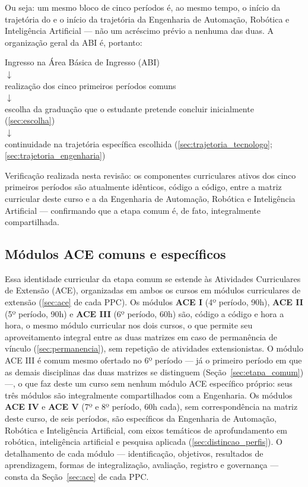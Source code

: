 Ou seja: um mesmo bloco de cinco períodos é, ao mesmo tempo, o início da trajetória do \ppccurso e o início da trajetória da Engenharia de Automação, Robótica e Inteligência Artificial — não um acréscimo prévio a nenhuma das duas. A organização geral da ABI é, portanto:

\begin{center}
Ingresso na Área Básica de Ingresso (ABI) \\
$\downarrow$ \\
realização dos cinco primeiros períodos comuns \\
$\downarrow$ \\
escolha da graduação que o estudante pretende concluir inicialmente (\autoref{sec:escolha}) \\
$\downarrow$ \\
continuidade na trajetória específica escolhida (\autoref{sec:trajetoria_tecnologo}; \autoref{sec:trajetoria_engenharia})
\end{center}

Verificação realizada nesta revisão: os componentes curriculares ativos dos cinco primeiros períodos são atualmente idênticos, código a código, entre a matriz curricular deste curso e a da Engenharia de Automação, Robótica e Inteligência Artificial — confirmando que a etapa comum é, de fato, integralmente compartilhada.

\subsection{Módulos ACE comuns e específicos}

Essa identidade curricular da etapa comum se estende às Atividades Curriculares de Extensão (ACE), organizadas em ambos os cursos em módulos curriculares de extensão (\autoref{sec:ace} de cada PPC). Os módulos \textbf{ACE I} (4º período, 90h), \textbf{ACE II} (5º período, 90h) e \textbf{ACE III} (6º período, 60h) são, código a código e hora a hora, o mesmo módulo curricular nos dois cursos, o que permite seu aproveitamento integral entre as duas matrizes em caso de permanência de vínculo (\autoref{sec:permanencia}), sem repetição de atividades extensionistas. O módulo ACE III é comum mesmo ofertado no 6º período — já o primeiro período em que as demais disciplinas das duas matrizes se distinguem (Seção~\ref{sec:etapa_comum}) —, o que faz deste \ppccurso um curso sem nenhum módulo ACE específico próprio: seus três módulos são integralmente compartilhados com a Engenharia. Os módulos \textbf{ACE IV} e \textbf{ACE V} (7º e 8º período, 60h cada), sem correspondência na matriz deste curso, de seis períodos, são específicos da Engenharia de Automação, Robótica e Inteligência Artificial, com eixos temáticos de aprofundamento em robótica, inteligência artificial e pesquisa aplicada (\autoref{sec:distincao_perfis}). O detalhamento de cada módulo — identificação, objetivos, resultados de aprendizagem, formas de integralização, avaliação, registro e governança — consta da Seção~\ref{sec:ace} de cada PPC.

